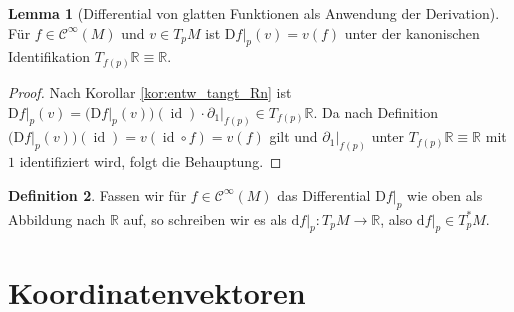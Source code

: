 \documentclass[a4paper]{scrbook}
\numberwithin{equation}{chapter}
\newcommand{\D}{\mathrm{d}}
\newcommand{\DD}{\mathrm{D}}
\DeclareMathOperator{\id}{id}
\newcommand{\sC}{\mathcal{C}^{\infty}}
\theoremstyle{definition}
\newtheorem{defn}{Definition}[section]
\newtheorem{lemma}[defn]{Lemma}
\begin{document}
\begin{lemma}[Differential von glatten Funktionen als Anwendung der Derivation]
	Für $f\in\sC(M)$ und $v \in T_pM$ ist $\left.\DD f\right|_p(v) = v(f)$ unter der kanonischen Identifikation $T_{f(p)}\mathbb R \equiv \mathbb R$.

	\begin{proof}
		Nach Korollar \ref{kor:entw_tangt_Rn} ist $\left.\DD f\right|_p(v) = \Big(\DD f\big|_p(v)\Big)(\id) \cdot \left.\partial_1\right|_{f(p)} \in T_{f(p)}\mathbb R$. Da nach Definition $\Big(\DD f\big|_p(v)\Big)(\id) = v(\id \circ f) = v(f)$ gilt und $\left.\partial_1\right|_{f(p)}$ unter $T_{f(p)}\mathbb R \equiv \mathbb R$ mit $1$ identifiziert wird, folgt die Behauptung.
	\end{proof}
\end{lemma}

\begin{defn}
	Fassen wir für $f \in \sC(M)$ das Differential $\left.\DD f\right|_p$ wie oben als Abbildung nach $\mathbb R$ auf, so schreiben wir es als $\left.\D f\right|_p \colon T_pM \to \mathbb R$, also $\left.\D f\right|_p \in T_p^*M$.
\end{defn}

\section{Koordinatenvektoren}
\end{document}
